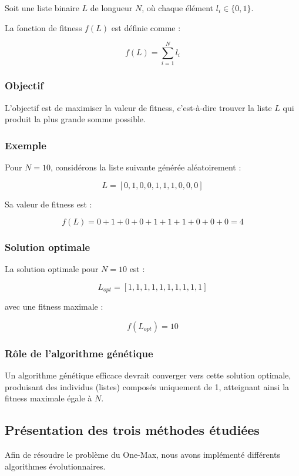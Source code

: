 \documentclass{article}
\begin{document}
Soit une liste binaire $L$ de longueur $N$, où chaque élément $l_i \in \{0,1\}$.

La fonction de fitness $f(L)$ est définie comme :

\[
f(L) = \sum_{i=1}^N l_i
\]

\subsubsection{Objectif}

L'objectif est de maximiser la valeur de fitness, c'est-à-dire trouver la liste $L$ qui produit la plus grande somme possible.

\subsubsection{Exemple}

Pour $N = 10$, considérons la liste suivante générée aléatoirement :

\[
L = [0, 1, 0, 0, 1, 1, 1, 0, 0, 0]
\]

Sa valeur de fitness est :

\[
f(L) = 0 + 1 + 0 + 0 + 1 + 1 + 1 + 0 + 0 + 0 = 4
\]

\subsubsection{Solution optimale}

La solution optimale pour $N = 10$ est :

\[
L_{opt} = [1, 1, 1, 1, 1, 1, 1, 1, 1, 1]
\]

avec une fitness maximale :

\[
f(L_{opt}) = 10
\]

\subsubsection{Rôle de l'algorithme génétique}

Un algorithme génétique efficace devrait converger vers cette solution optimale, produisant des individus (listes) composés uniquement de 1, atteignant ainsi la fitness maximale égale à $N$.

\subsection{Présentation des trois méthodes étudiées}
Afin de résoudre le problème du One-Max, nous avons implémenté différents algorithmes évolutionnaires.
\end{document}
